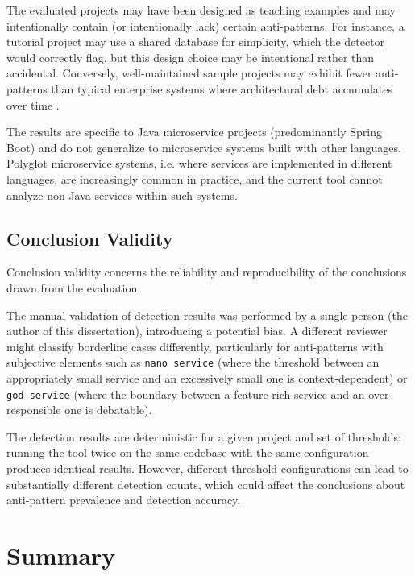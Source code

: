 \par The evaluated projects may have been designed as teaching examples and may intentionally contain (or intentionally lack) certain anti-patterns. For instance, a tutorial project may use a shared database for simplicity, which the detector would correctly flag, but this design choice may be intentional rather than accidental. Conversely, well-maintained sample projects may exhibit fewer anti-patterns than typical enterprise systems where architectural debt accumulates over time \cite{Taibi2018}.

\par The results are specific to Java microservice projects (predominantly Spring Boot) and do not generalize to microservice systems built with other languages. Polyglot microservice systems, i.e. where services are implemented in different languages, are increasingly common in practice, and the current tool cannot analyze non-Java services within such systems.

\subsection{Conclusion Validity}
\label{subsec:conclusion-validity}

\par Conclusion validity concerns the reliability and reproducibility of the conclusions drawn from the evaluation.

\par The manual validation of detection results was performed by a single person (the author of this dissertation), introducing a potential bias. A different reviewer might classify borderline cases differently, particularly for anti-patterns with subjective elements such as \texttt{nano service} (where the threshold between an appropriately small service and an excessively small one is context-dependent) or \texttt{god service} (where the boundary between a feature-rich service and an over-responsible one is debatable).

\par The detection results are deterministic for a given project and set of thresholds: running the tool twice on the same codebase with the same configuration produces identical results. However, different threshold configurations can lead to substantially different detection counts, which could affect the conclusions about anti-pattern prevalence and detection accuracy.

\section{Summary}
\label{sec:ch5-summary}

